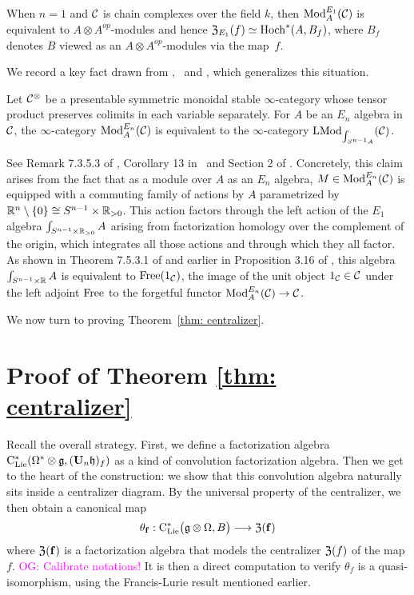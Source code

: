 \documentclass[11pt]{amsart}
\numberwithin{equation}{section}
\def\owen{\textcolor{magenta}{OG: }\textcolor{magenta}}
\begin{document}
When $n=1$ and $\mathcal C$ is chain complexes over the field $k$, then ${\rm Mod}^{E_1}_A(\mathcal C)$ is equivalent to $A\otimes A^{op}$-modules and hence ${\frak Z}_{E_1}(f) \simeq {\rm Hoch}^*(A,B_f)$,
where $B_f$ denotes $B$ viewed as an $A\otimes A^{op}$-modules via the map~$f$.

We record a key fact drawn from \cite{LurieHA},~\cite{FrancisHH}  and \cite{GG-Notes}, which generalizes this situation.

\begin{prp}
\label{P:ModentoModSn}
Let $\mathcal C^\otimes$ be a presentable symmetric monoidal stable $\infty$-category whose tensor product preserves colimits in each variable separately.
For $A$ be an $E_n$ algebra in $\mathcal C$,
the $\infty$-category ${\rm Mod}^{E_n}_A(\mathcal C)$ is equivalent to the $\infty$-category ${\rm LMod}_{\int_{S^{n-1} A}}(\mathcal C)$.
\end{prp}

See Remark 7.3.5.3 of \cite{LurieHA}, Corollary 13 in~\cite{GG-Notes} and Section 2 of \cite{FrancisHH}.
Concretely, this claim arises from the fact that as a module over $A$ as an $E_n$ algebra, 
$M \in {\rm Mod}^{E_n}_A(\mathcal C)$ is equipped with a commuting family of actions by $A$ parametrized by $\mathbb R^n \setminus \{0\}\cong S^{n-1} \times \mathbb R_{>0}$.
This action factors through the left action of the $E_1$ algebra $\int_{S^{n-1} \times \mathbb R_{>0}} A$ arising from factorization homology over the complement of the origin,
which integrates all those actions and through which they all factor. 
As shown in Theorem 7.5.3.1 of \cite{LurieHA} and earlier in Proposition 3.16 of \cite{FrancisHH}, 
this algebra $\int_{S^{n-1} \times \mathbb R} A$ is equivalent to ${\rm Free}(1_\mathcal C)$, 
the image of the unit object $1_\mathcal C \in \mathcal C$ under the left adjoint ${\rm Free}$ to the forgetful functor ${\rm Mod}^{E_n}_A(\mathcal C) \to \mathcal C$.

We now turn to proving Theorem~\ref{thm: centralizer}.

\section{Proof of Theorem \ref{thm: centralizer}}

Recall the overall strategy.
First, we define a factorization algebra ${\rm C}_{\rm Lie}^*(\Omega^* \otimes \mathfrak g, (\mathbf U_n \mathfrak h)_f)$ as a kind of convolution factorization algebra.
Then we get to the heart of the construction:
we show that this convolution algebra naturally sits inside a centralizer diagram.
By the universal property of the centralizer, we then obtain 
a canonical map 
\[
\theta_{\bf{f}}: {\rm C}_{\rm Lie}^*\big(\mathfrak g\otimes \Omega , B \big) \longrightarrow  {\frak Z}(\mathbf{f})
\]
where ${\frak Z}(\mathbf{f})$ is a factorization algebra that models the centralizer ${\frak Z}(f)$ of the map $f$.
\owen{Calibrate notations!}
It is then a direct computation to verify $\theta_f$ is a quasi-isomorphism,
using the Francis-Lurie result mentioned earlier.
\end{document}
